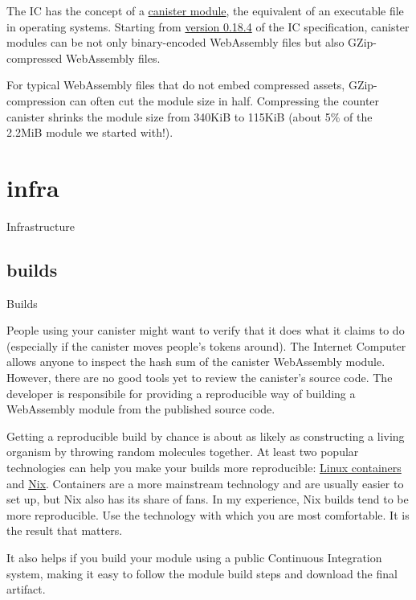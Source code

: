 \documentclass{article}
\begin{document}
The IC has the concept of a \href{https://internetcomputer.org/docs/current/references/ic-interface-spec/#ic-install_code}{canister module}, the equivalent of an executable file in operating systems.
  Starting from \href{https://internetcomputer.org/docs/current/references/ic-interface-spec/#0_18_4}{version 0.18.4} of the IC specification, canister modules can be not only binary-encoded WebAssembly files but also GZip-compressed WebAssembly files.

For typical WebAssembly files that do not embed compressed assets, GZip-compression can often cut the module size in half.
Compressing the counter canister shrinks the module size from 340KiB to 115KiB (about 5\% of the 2.2MiB module we started with!).

\section{infra}{Infrastructure}
\subsection{builds}{Builds}

People using your canister might want to verify that it does what it claims to do (especially if the canister moves people's tokens around).
The Internet Computer allows anyone to inspect the  hash sum of the canister WebAssembly module.
However, there are no good tools yet to review the canister's source code.
The developer is responsibile for providing a reproducible way of building a WebAssembly module from the published source code.


Getting a reproducible build by chance is about as likely as constructing a living organism by throwing random molecules together.
At least two popular technologies can help you make your builds more reproducible: \href{https://linuxcontainers.org/}{Linux containers} and \href{https://nixos.org/}{Nix}.
Containers are a more mainstream technology and are usually easier to set up, but Nix also has its share of fans.
In my experience, Nix builds tend to be more reproducible.
Use the technology with which you are most comfortable.
It is the result that matters.

It also helps if you build your module using a public Continuous Integration system, making it easy to follow the module build steps and download the final artifact.
\end{document}
